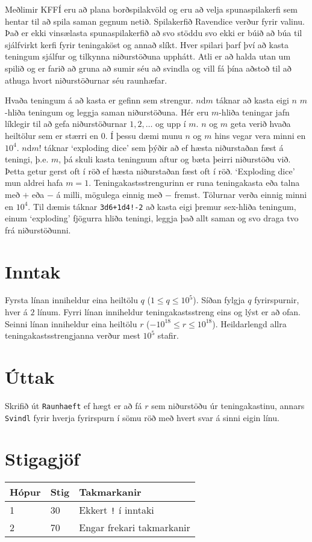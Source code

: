 %
Meðlimir KFFÍ eru að plana borðspilakvöld og eru að velja spunaspilakerfi sem hentar til að spila saman gegnum netið.
Spilakerfið Ravendice verður fyrir valinu. Það er ekki vinsælasta spunaspilakerfið að svo stöddu svo ekki er búið að
búa til sjálfvirkt kerfi fyrir teningaköst og annað slíkt. Hver spilari þarf því að kasta teningum sjálfur og tilkynna
niðurstöðuna upphátt. Atli er að halda utan um spilið og er farið að gruna að sumir séu að svindla og vill fá þína aðstoð
til að athuga hvort niðurstöðurnar séu raunhæfar.

Hvaða teningum á að kasta er gefinn sem strengur. $n$d$m$ táknar að kasta eigi $n$ $m$-hliða teningum og leggja saman
niðurstöðuna. Hér eru $m$-hliða teningar jafn líklegir til að gefa niðurstöðurnar $1, 2, \dots$ og upp í $m$. $n$ og $m$
geta verið hvaða heiltölur sem er stærri en $0$. Í þessu dæmi munu $n$ og $m$ hins vegar vera minni en $10^4$. $n$d$m!$
táknar `exploding dice' sem þýðir að ef hæsta niðurstaðan fæst á teningi, þ.e. $m$, þá skuli kasta teningnum aftur og
bæta þeirri niðurstöðu við. Þetta getur gerst oft í röð ef hæsta niðurstaðan fæst oft í röð. `Exploding dice' mun aldrei
hafa $m = 1$. Teningakastsstrengurinn er runa teningakasta eða talna með $+$ eða $-$ á milli, mögulega einnig með $-$ fremst. 
Tölurnar verða einnig minni en $10^4$. Til dæmis táknar \verb|3d6+1d4!-2| að kasta eigi þremur sex-hliða teningum, einum 
`exploding' fjögurra hliða teningi, leggja það allt saman og svo draga tvo frá niðurstöðunni.

\section*{Inntak}
Fyrsta línan inniheldur eina heiltölu $q$ ($1 \leq q \leq 10^5$). Síðan fylgja $q$ fyrirspurnir, hver á $2$ línum.
Fyrri línan inniheldur teningakastsstreng eins og lýst er að ofan. Seinni línan inniheldur eina
heiltölu $r$ ($-10^{18} \leq r \leq 10^{18}$). Heildarlengd allra teningakastsstrengjanna verður mest $10^5$ stafir.

\section*{Úttak}
Skrifið út \texttt{Raunhaeft} ef hægt er að fá $r$ sem niðurstöðu úr teningakastinu, annars \texttt{Svindl} fyrir
hverja fyrirspurn í sömu röð með hvert svar á sinni eigin línu.

\section*{Stigagjöf}
\begin{tabular}{|l|l|l|}
\hline
Hópur & Stig & Takmarkanir \\ \hline
1     & 30   & Ekkert \verb|!| í inntaki \\ \hline
2     & 70   & Engar frekari takmarkanir \\ \hline
\end{tabular}

